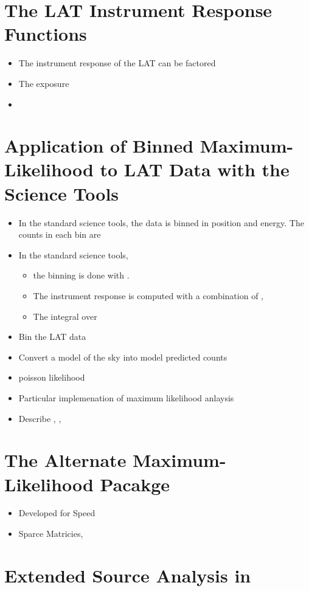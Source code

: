 \section{The LAT Instrument Response Functions}

\begin{itemize}
  \item The instrument response of the LAT can be factored
  \item The exposure
  \item
\end{itemize}

\section{Application of Binned Maximum-Likelihood to LAT Data with the Science Tools}

\begin{itemize}
  \item In the standard science tools, the data is binned in position and energy.
    The counts in each bin are
  \item In the standard science tools, 
    \begin{itemize}
      \item the binning is done with \gtbin.
      \item The instrument response is computed with a combination of \gtltcube,
        \gtexpcube
      \item The integral over 
    \end{itemize}
  \item Bin the LAT data
  \item Convert a model of the sky into model predicted counts
  \item poisson likelihood
  \item Particular implemenation of maximum likelihood anlaysis
  \item Describe \gtbin, \gtselect, \gtlike
\end{itemize}




\section{The Alternate Maximum-Likelihood Pacakge \pointlike}

\begin{itemize}
\item Developed for Speed
\item Sparce Matricies, 
\end{itemize}

\section{Extended Source Analysis in \pointlike}
